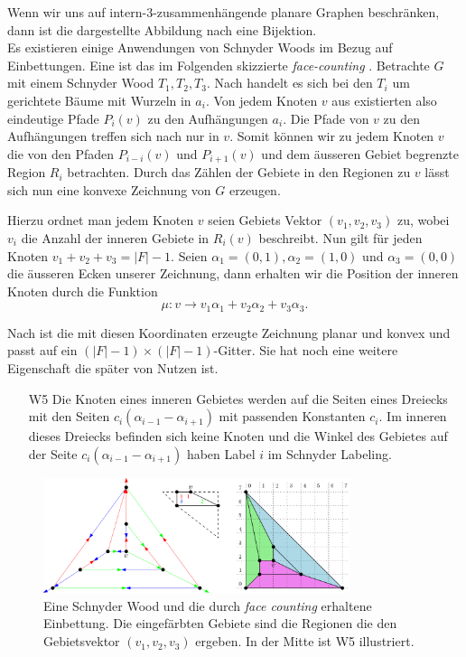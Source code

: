 Wenn wir uns auf intern-3-zusammenhängende planare Graphen beschränken, dann ist die dargestellte Abbildung nach \cite[Theorem 2.3]{felsner04} eine Bijektion. \\

Es existieren einige Anwendungen von Schnyder Woods im Bezug auf Einbettungen. Eine ist das im Folgenden skizzierte \textit{face-counting} \cite{felsner01}. Betrachte $G$ mit einem Schnyder Wood $T_1,T_2,T_3$. Nach \cite[Korollar 2.5]{felsner04} handelt es sich bei den $T_i$ um gerichtete Bäume mit Wurzeln in $a_i$. Von jedem Knoten $v$ aus existierten also eindeutige Pfade $P_i(v)$ zu den Aufhängungen $a_i$. Die Pfade von $v$ zu den Aufhängungen treffen sich nach \cite[Lemma 2.4]{felsner04} nur in $v$. Somit können wir zu jedem Knoten $v$ die von den Pfaden $P_{i-i}(v)$ und $P_{i+1}(v)$ und dem äusseren Gebiet begrenzte Region $R_i$ betrachten. Durch das Zählen der Gebiete in den Regionen zu $v$ lässt sich nun eine konvexe Zeichnung von $G$ erzeugen. \

Hierzu ordnet man jedem Knoten $v$ seien Gebiets Vektor $(v_1,v_2,v_3)$ zu, wobei $v_i$ die Anzahl der inneren Gebiete in $R_i(v)$ beschreibt. Nun gilt für jeden Knoten $v_1+v_2+v_3 = |F|-1$. Seien $\alpha_1 = (0,1),\alpha_2 = (1,0)$ und $\alpha_3 = (0,0)$ die äusseren Ecken unserer Zeichnung, dann erhalten wir die Position der inneren Knoten durch die Funktion 
$$\mu:v\to v_1\alpha_1 + v_2\alpha_2+v_3\alpha_3.$$ 

Nach \cite[Theorem 2.7]{felsner04} ist die mit diesen Koordinaten erzeugte Zeichnung planar und konvex und passt auf ein $(|F|-1)\times(|F|-1)$-Gitter. Sie hat noch eine weitere Eigenschaft die später von Nutzen ist.

\begin{itemize}
\item [W5] Die Knoten eines inneren Gebietes werden auf die Seiten eines Dreiecks mit den Seiten $c_i(\alpha_{i-1}-\alpha_{i+1})$ mit passenden Konstanten $c_i$. Im inneren dieses Dreiecks befinden sich keine Knoten und die Winkel des Gebietes auf der Seite $c_i(\alpha_{i-1}-\alpha_{i+1})$ haben Label $i$ im Schnyder Labeling.
\end{itemize}

\begin{figure}[h]
	\centering
  \includegraphics[width=0.8\textwidth]{face_counting.png}
	\caption{Eine Schnyder Wood und die durch \textit{face counting} erhaltene Einbettung. Die eingefärbten Gebiete sind die Regionen die den Gebietsvektor $(v_1,v_2,v_3)$ ergeben. In der Mitte ist W5 illustriert.}
	\label{face_counting}
\end{figure}
